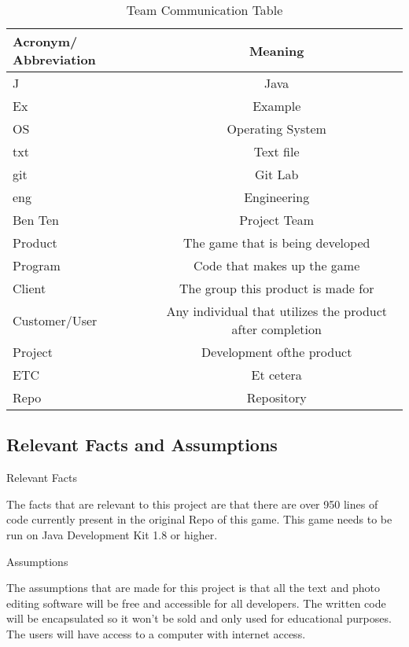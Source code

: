 \documentclass[12pt, titlepage]{article}
\begin{document}
\begin{table}[h!]
  \caption{Team Communication Table}
  \label{tab:table1}
  \begin{tabular}{|l|c | }
    \hline
    \textbf{Acronym/ Abbreviation} & \textbf{Meaning} \\
    \hline
	J & Java\\
   \hline
	Ex & Example\\
    \hline
	OS & Operating System\\
    \hline
	txt & Text file\\
 \hline
	git & Git Lab\\
 \hline
	eng & Engineering\\
 \hline
	Ben Ten & Project Team\\
 \hline
	Product & The game that is being developed\\
 \hline
	Program & Code that makes up the game\\
 \hline
	Client & The group this product is made for\\
 \hline
	Customer/User & Any individual that utilizes the product after completion\\	
 \hline
	Project & Development ofthe product\\
 \hline
	ETC & Et cetera\\
 \hline
	Repo & Repository\\
\hline

  \end{tabular}
\end{table}



\subsection{Relevant Facts and Assumptions}
Relevant Facts


The facts that are relevant to this project are that there are over 950 lines
of code currently present in the original Repo of this game. This game needs %
to be run on Java Development Kit 1.8 or higher.

Assumptions

The assumptions that are made for this project is that all the text and photo
editing software will be free and accessible for all developers. The written
code will be encapsulated so it won't %
be sold and only used for educational purposes. The users will have access to a
computer with internet access.
\end{document}
